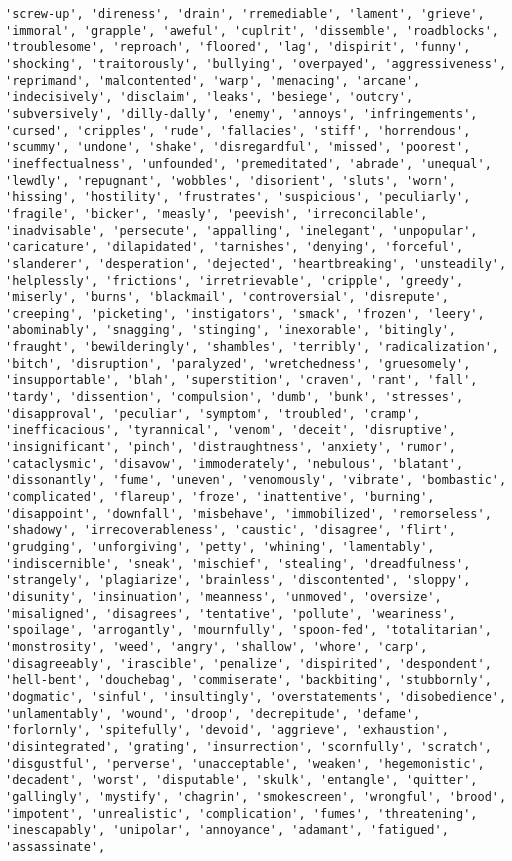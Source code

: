 \documentclass[11pt]{article}
\begin{document}
\begin{Verbatim}[commandchars=\\\{\}]
'screw-up', 'direness', 'drain', 'rremediable', 'lament', 'grieve', 'immoral', 'grapple', 'aweful', 'cuplrit', 'dissemble', 'roadblocks', 'troublesome', 'reproach', 'floored', 'lag', 'dispirit', 'funny', 'shocking', 'traitorously', 'bullying', 'overpayed', 'aggressiveness', 'reprimand', 'malcontented', 'warp', 'menacing', 'arcane', 'indecisively', 'disclaim', 'leaks', 'besiege', 'outcry', 'subversively', 'dilly-dally', 'enemy', 'annoys', 'infringements', 'cursed', 'cripples', 'rude', 'fallacies', 'stiff', 'horrendous', 'scummy', 'undone', 'shake', 'disregardful', 'missed', 'poorest', 'ineffectualness', 'unfounded', 'premeditated', 'abrade', 'unequal', 'lewdly', 'repugnant', 'wobbles', 'disorient', 'sluts', 'worn', 'hissing', 'hostility', 'frustrates', 'suspicious', 'peculiarly', 'fragile', 'bicker', 'measly', 'peevish', 'irreconcilable', 'inadvisable', 'persecute', 'appalling', 'inelegant', 'unpopular', 'caricature', 'dilapidated', 'tarnishes', 'denying', 'forceful', 'slanderer', 'desperation', 'dejected', 'heartbreaking', 'unsteadily', 'helplessly', 'frictions', 'irretrievable', 'cripple', 'greedy', 'miserly', 'burns', 'blackmail', 'controversial', 'disrepute', 'creeping', 'picketing', 'instigators', 'smack', 'frozen', 'leery', 'abominably', 'snagging', 'stinging', 'inexorable', 'bitingly', 'fraught', 'bewilderingly', 'shambles', 'terribly', 'radicalization', 'bitch', 'disruption', 'paralyzed', 'wretchedness', 'gruesomely', 'insupportable', 'blah', 'superstition', 'craven', 'rant', 'fall', 'tardy', 'dissention', 'compulsion', 'dumb', 'bunk', 'stresses', 'disapproval', 'peculiar', 'symptom', 'troubled', 'cramp', 'inefficacious', 'tyrannical', 'venom', 'deceit', 'disruptive', 'insignificant', 'pinch', 'distraughtness', 'anxiety', 'rumor', 'cataclysmic', 'disavow', 'immoderately', 'nebulous', 'blatant', 'dissonantly', 'fume', 'uneven', 'venomously', 'vibrate', 'bombastic', 'complicated', 'flareup', 'froze', 'inattentive', 'burning', 'disappoint', 'downfall', 'misbehave', 'immobilized', 'remorseless', 'shadowy', 'irrecoverableness', 'caustic', 'disagree', 'flirt', 'grudging', 'unforgiving', 'petty', 'whining', 'lamentably', 'indiscernible', 'sneak', 'mischief', 'stealing', 'dreadfulness', 'strangely', 'plagiarize', 'brainless', 'discontented', 'sloppy', 'disunity', 'insinuation', 'meanness', 'unmoved', 'oversize', 'misaligned', 'disagrees', 'tentative', 'pollute', 'weariness', 'spoilage', 'arrogantly', 'mournfully', 'spoon-fed', 'totalitarian', 'monstrosity', 'weed', 'angry', 'shallow', 'whore', 'carp', 'disagreeably', 'irascible', 'penalize', 'dispirited', 'despondent', 'hell-bent', 'douchebag', 'commiserate', 'backbiting', 'stubbornly', 'dogmatic', 'sinful', 'insultingly', 'overstatements', 'disobedience', 'unlamentably', 'wound', 'droop', 'decrepitude', 'defame', 'forlornly', 'spitefully', 'devoid', 'aggrieve', 'exhaustion', 'disintegrated', 'grating', 'insurrection', 'scornfully', 'scratch', 'disgustful', 'perverse', 'unacceptable', 'weaken', 'hegemonistic', 'decadent', 'worst', 'disputable', 'skulk', 'entangle', 'quitter', 'gallingly', 'mystify', 'chagrin', 'smokescreen', 'wrongful', 'brood', 'impotent', 'unrealistic', 'complication', 'fumes', 'threatening', 'inescapably', 'unipolar', 'annoyance', 'adamant', 'fatigued', 'assassinate', 
\end{Verbatim}
\end{document}
